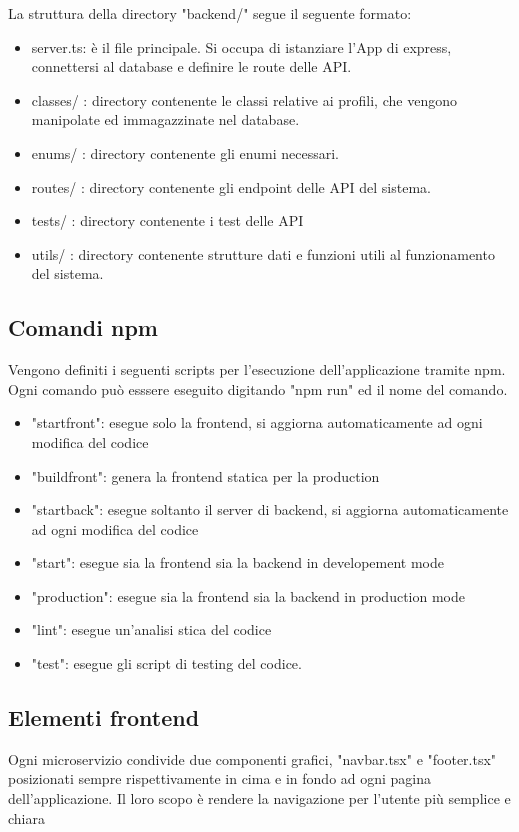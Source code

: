 \documentclass{report}
\begin{document}
La struttura della directory "backend/" segue il seguente formato:
\begin{itemize}
	\item server.ts: è il file principale. Si occupa di istanziare l'App di express,
	      connettersi al database e definire le route delle API.
	\item classes/ : directory contenente le classi relative ai profili, che vengono manipolate ed immagazzinate nel database.
	\item enums/ : directory contenente gli enumi necessari.
	\item routes/ : directory contenente gli endpoint delle API del sistema.
	\item tests/ : directory contenente i test delle API
	\item utils/ : directory contenente strutture dati e funzioni utili al funzionamento del sistema.
\end{itemize}

\subsection{Comandi npm}
Vengono definiti i seguenti scripts per l'esecuzione dell'applicazione tramite npm. Ogni comando può esssere eseguito digitando "npm run" ed il nome del comando.
\begin{itemize}
	\item "startfront": esegue solo la frontend, si aggiorna automaticamente ad ogni modifica del codice
	\item "buildfront": genera la frontend statica per la production
	\item "startback": esegue soltanto il server di backend, si aggiorna automaticamente ad ogni modifica del codice
	\item "start": esegue sia la frontend sia la backend in developement mode
	\item "production": esegue sia la frontend sia la backend in production mode
	\item "lint": esegue un'analisi stica del codice
	\item "test": esegue gli script di testing del codice.
\end{itemize}

\subsection{Elementi frontend}
Ogni microservizio condivide due componenti grafici, "navbar.tsx" e "footer.tsx" posizionati sempre rispettivamente in cima e in fondo ad ogni pagina dell'applicazione.
Il loro scopo è rendere la navigazione per l'utente più semplice e chiara
\end{document}
